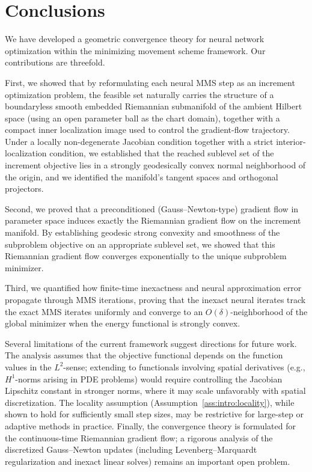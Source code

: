 \documentclass[twoside,11pt]{article}
\begin{document}
\section{Conclusions}\label{sec:conclusions}

We have developed a geometric convergence theory for neural network optimization
within the minimizing movement scheme framework.
Our contributions are threefold.

First, we showed that by reformulating each neural MMS step as an increment
optimization problem, the feasible set naturally carries the structure of a
boundaryless smooth embedded Riemannian submanifold of the ambient Hilbert space (using an open parameter ball as the chart domain), together with a compact inner localization image used to control the gradient-flow trajectory.
Under a locally non-degenerate Jacobian condition together with a strict interior-localization condition, we established that the reached sublevel set of the increment objective lies in a strongly geodesically convex normal neighborhood of the origin, and we identified the manifold's tangent spaces and orthogonal projectors.

Second, we proved that a preconditioned (Gauss--Newton-type) gradient flow in
parameter space induces exactly the Riemannian gradient flow on the increment
manifold. By establishing geodesic strong convexity and smoothness of the
subproblem objective on an appropriate sublevel set, we showed that this
Riemannian gradient flow converges exponentially to the unique subproblem minimizer.

Third, we quantified how finite-time inexactness and neural approximation error
propagate through MMS iterations, proving that the inexact neural iterates
track the exact MMS iterates uniformly and converge to an $O(\delta)$-neighborhood
of the global minimizer when the energy functional is strongly convex.

Several limitations of the current framework suggest directions for future work.
The analysis assumes that the objective functional depends on the function values
in the $L^2$-sense; extending to functionals involving spatial derivatives (e.g., 
$H^1$-norms arising in PDE problems) would require controlling the Jacobian
Lipschitz constant in stronger norms, where it may scale unfavorably with spatial
discretization.
The locality assumption (Assumption~\ref{ass:intro:locality}), while shown to hold
for sufficiently small step sizes, may be restrictive for large-step or adaptive
methods in practice.
Finally, the convergence theory is formulated for the continuous-time Riemannian
gradient flow; a rigorous analysis of the discretized Gauss--Newton updates
(including Levenberg--Marquardt regularization and inexact linear solves) remains
an important open problem.
\end{document}
